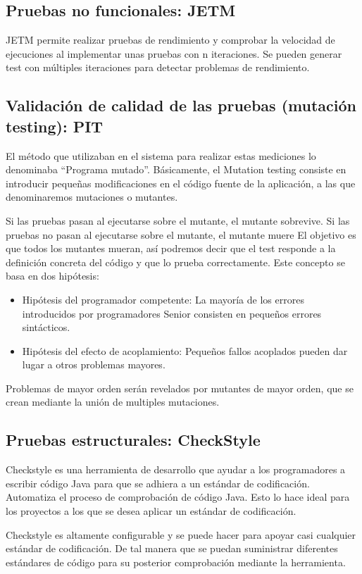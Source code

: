 \documentclass[12pt, a4paper, titlepage]{article}
\begin{document}
	\subsection{Pruebas no funcionales: JETM}
	JETM permite realizar pruebas de rendimiento y comprobar la velocidad de ejecuciones al implementar unas pruebas con n iteraciones. Se pueden generar test con múltiples iteraciones para detectar problemas de rendimiento.
	\subsection{Validación de calidad de las pruebas (mutación testing): PIT}
	
	El  método que utilizaban en el sistema para realizar estas mediciones lo denominaba “Programa mutado”.
	Básicamente, el Mutation testing consiste en introducir pequeñas modificaciones en el código fuente de la aplicación, a las que denominaremos mutaciones o mutantes.
	
	Si las pruebas pasan al ejecutarse sobre el mutante, el mutante sobrevive.
	Si las pruebas no pasan al ejecutarse sobre el mutante, el mutante muere
	El objetivo es que todos los mutantes mueran, así podremos decir que el test responde a la definición concreta del código y que lo prueba correctamente.
	Este concepto se basa en dos hipótesis:
	\begin{itemize}
	\item Hipótesis del programador competente: La mayoría de los errores introducidos por programadores Senior consisten en pequeños errores sintácticos.
	\item Hipótesis del efecto de acoplamiento: Pequeños fallos acoplados pueden dar lugar a otros problemas mayores.
		\end{itemize}
	Problemas de mayor orden serán revelados por mutantes de mayor orden, que se crean mediante la unión de multiples mutaciones.
	
		\subsection{Pruebas estructurales: CheckStyle}
		
		Checkstyle es una herramienta de desarrollo que ayudar a los programadores a escribir código Java para que se adhiera a un estándar de codificación. Automatiza el proceso de comprobación de código Java. Esto lo hace ideal para los proyectos a los que se desea aplicar un estándar de codificación.
		
		Checkstyle es altamente configurable y se puede hacer para apoyar casi cualquier estándar de codificación. De tal manera que se puedan suministrar diferentes estándares de código para su posterior comprobación mediante la herramienta.
		
\end{document}
